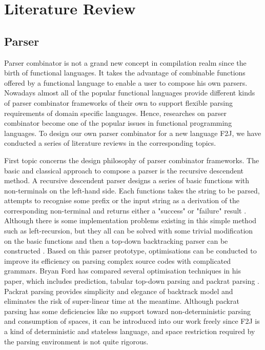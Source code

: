\chapter{Literature Review}

\section{Parser}

Parser combinator is not a grand new concept in compilation realm since the birth of functional languages. It takes the advantage of combinable functions offered by a functional language to enable a user to compose his own parsers. Nowadays almost all of the popular functional languages provide different kinds of parser combinator frameworks of their own to support flexible parsing requirements of domain specific languages. Hence, researches on parser combinator become one of the popular issues in functional programming languages. To design our own parser combinator for a new language F2J, we have conducted a series of literature reviews in the corresponding topics.

First topic concerns the design philosophy of parser combinator frameworks. The basic and classical approach to compose a parser is the recursive descendent method. A recursive descendent parser designs a series of basic functions with non-terminals on the left-hand side. Each functions takes the string to be parsed, attempts to recognise some prefix or the input string as a derivation of the corresponding non-terminal and returns either a "success" or "failure" result \cite{Ford2002}. Although there is some implementation problems existing in this simple method such as left-recursion, but they all can be solved with some trivial modification on the basic functions and then a top-down backtracking parser can be constructed \cite{Compilers:2006}. Based on this parser prototype, optimisations can be conducted to improve its efficiency on parsing complex source codes with complicated grammars. Bryan Ford has compared several optimisation techniques in his paper, which includes prediction, tabular top-down parsing and packrat parsing \cite{Ford2002}. Packrat parsing provides simplicity and elegance of backtrack model and eliminates the risk of super-linear time at the meantime. Although packrat parsing has some deficiencies like no support toward non-deterministic parsing and consumption of spaces, it can be introduced into our work freely since F2J is a kind of deterministic and stateless language, and space restriction required by the parsing environment is not quite rigorous.

